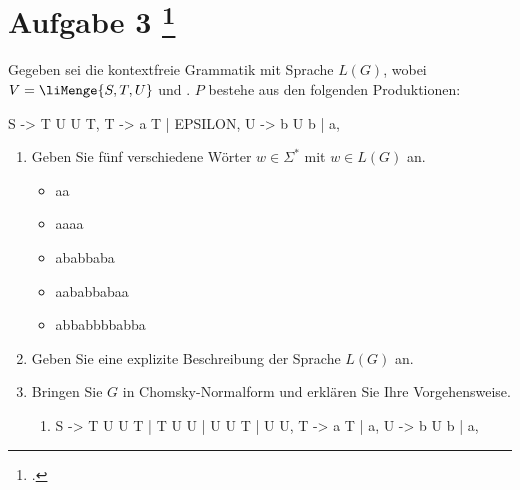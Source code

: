 \documentclass{lehramt-informatik-aufgabe}
\begin{document}
\let\schrittE=\liChomskyUeberErklaerung

\section{Aufgabe 3
\footcite{examen:66115:2019:03}}

Gegeben sei die kontextfreie Grammatik \liGrammatik{} mit Sprache
$L(G)$, wobei $V = \liMenge{S,T,U}$ und . $P$ bestehe
aus den folgenden Produktionen:

\begin{liProduktionsRegeln}
S -> T U U T,
T -> a T | EPSILON,
U -> b U b | a,
\end{liProduktionsRegeln}
\begin{enumerate}


\item Geben Sie fünf verschiedene Wörter $w \in \Sigma^*$ mit $w \in
L(G)$ an.

\begin{liAntwort}
\begin{itemize}
\item aa
\item aaaa
\item ababbaba
\item aababbabaa
\item abbabbbbabba
\end{itemize}
\end{liAntwort}


\item Geben Sie eine explizite Beschreibung der Sprache $L(G)$ an.

\begin{liAntwort}
\end{liAntwort}


\item Bringen Sie $G$ in Chomsky-Normalform und erklären Sie Ihre
Vorgehensweise.

\begin{liAntwort}
\begin{enumerate}
\item \schrittE{1}

\begin{liProduktionsRegeln}
S -> T U U T | T U U | U U T | U U,
T -> a T | a,
U -> b U b | a,
\end{liProduktionsRegeln}


\end{enumerate}
\end{liAntwort}
\end{enumerate}
\end{document}
